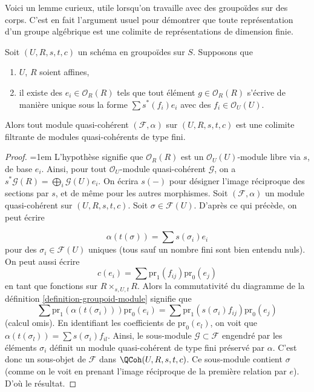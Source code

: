 \noindent
Voici un lemme curieux, utile lorsqu'on travaille avec des groupoïdes
sur des corps. C'est en fait l'argument usuel pour démontrer que toute
représentation d'un groupe algébrique est une colimite de représentations
de dimension finie.

\begin{lemma}
\label{lemma-colimit-finite-type}
Soit $(U, R, s, t, c)$ un schéma en groupoïdes sur $S$.
Supposons que
\begin{enumerate}
\item $U$, $R$ soient affines,
\item il existe des $e_i \in \mathcal{O}_R(R)$ tels que
tout élément $g \in \mathcal{O}_R(R)$ s'écrive de manière unique sous la forme
$\sum s^*(f_i)e_i$ avec des $f_i \in \mathcal{O}_U(U)$.
\end{enumerate}
Alors tout module quasi-cohérent $(\mathcal{F}, \alpha)$ sur $(U, R, s, t, c)$
est une colimite filtrante de modules quasi-cohérents de type fini.
\end{lemma}

\begin{proof}
{\emergencystretch=1em L'hypothèse signifie que $\mathcal{O}_R(R)$ est un
$\mathcal{O}_U(U)$-module libre via $s$, de base $e_i$. Ainsi,
pour tout $\mathcal{O}_U$-module quasi-cohérent $\mathcal{G}$,
on a $s^*\mathcal{G}(R) = \bigoplus_i \mathcal{G}(U)e_i$.
On écrira $s(-)$ pour désigner l'image réciproque des sections par $s$, et
de même pour les autres morphismes.
Soit $(\mathcal{F}, \alpha)$ un module quasi-cohérent sur
$(U, R, s, t, c)$. Soit $\sigma \in \mathcal{F}(U)$. D'après ce qui précède,
on peut écrire\par}
$$
\alpha(t(\sigma)) = \sum s(\sigma_i) e_i
$$
pour des $\sigma_i \in \mathcal{F}(U)$ uniques (tous sauf un nombre fini
sont bien entendu nuls). On peut aussi écrire
$$
c(e_i) = \sum \text{pr}_1(f_{ij}) \text{pr}_0(e_j)
$$
en tant que fonctions sur $R \times_{s, U, t}R$. Alors la commutativité du diagramme
de la définition \ref{definition-groupoid-module} signifie que
$$
\sum \text{pr}_1(\alpha(t(\sigma_i))) \text{pr}_0(e_i)
=
\sum \text{pr}_1(s(\sigma_i)f_{ij}) \text{pr}_0(e_j)
$$
(calcul omis). En identifiant les coefficients de $\text{pr}_0(e_l)$,
on voit que $\alpha(t(\sigma_l)) = \sum s(\sigma_i)f_{il}$. Ainsi,
le sous-module $\mathcal{G} \subset \mathcal{F}$ engendré par les
éléments $\sigma_i$ définit un module quasi-cohérent de type fini
préservé par $\alpha$. C'est donc un sous-objet de $\mathcal{F}$ dans
$\QCoh(U, R, s, t, c)$. Ce sous-module contient $\sigma$
(comme on le voit en prenant l'image réciproque de la première relation par $e$). D'où le résultat.
\end{proof}

